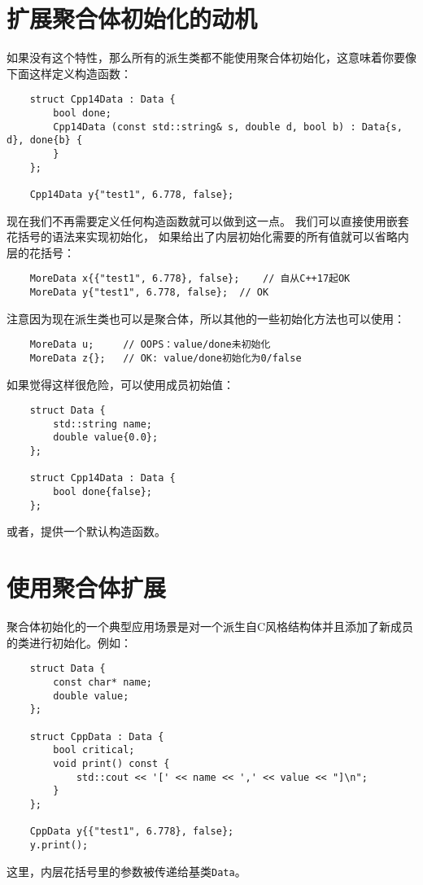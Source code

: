 \section{扩展聚合体初始化的动机}
如果没有这个特性，那么所有的派生类都不能使用聚合体初始化，这意味着你要像下面这样定义构造函数：
\begin{lstlisting}
    struct Cpp14Data : Data {
        bool done;
        Cpp14Data (const std::string& s, double d, bool b) : Data{s, d}, done{b} {
        }
    };

    Cpp14Data y{"test1", 6.778, false};
\end{lstlisting}
现在我们不再需要定义任何构造函数就可以做到这一点。
我们可以直接使用嵌套花括号的语法来实现初始化，
如果给出了内层初始化需要的所有值就可以省略内层的花括号：
\begin{lstlisting}
    MoreData x{{"test1", 6.778}, false};    // 自从C++17起OK
    MoreData y{"test1", 6.778, false};  // OK
\end{lstlisting}
注意因为现在派生类也可以是聚合体，所以其他的一些初始化方法也可以使用：
\begin{lstlisting}
    MoreData u;     // OOPS：value/done未初始化
    MoreData z{};   // OK: value/done初始化为0/false
\end{lstlisting}
如果觉得这样很危险，可以使用成员初始值：
\begin{lstlisting}
    struct Data {
        std::string name;
        double value{0.0};
    };

    struct Cpp14Data : Data {
        bool done{false};
    };
\end{lstlisting}
或者，提供一个默认构造函数。

\section{使用聚合体扩展}
聚合体初始化的一个典型应用场景是对一个派生自C风格结构体并且添加了新成员的类进行初始化。例如：
\begin{lstlisting}
    struct Data {
        const char* name;
        double value;
    };

    struct CppData : Data {
        bool critical;
        void print() const {
            std::cout << '[' << name << ',' << value << "]\n";
        }
    };

    CppData y{{"test1", 6.778}, false};
    y.print();
\end{lstlisting}
这里，内层花括号里的参数被传递给基类\texttt{Data}。

